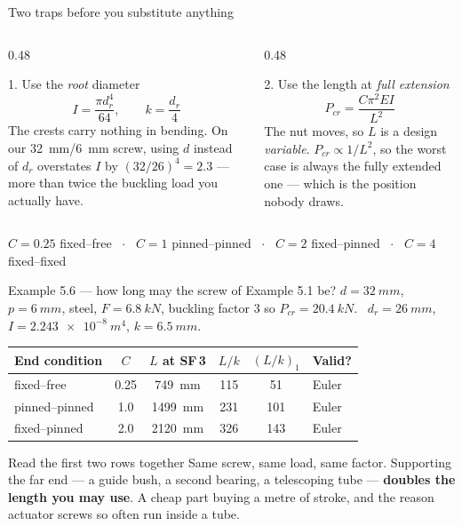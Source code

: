\documentclass[aspectratio=169,10pt]{beamer}
\begin{document}
\begin{frame}{Two traps before you substitute anything}
\begin{columns}[T]
\begin{column}{0.48\textwidth}
\begin{alertblock}{1. Use the \emph{root} diameter}
\[ I=\frac{\pi d_r^{4}}{64},\qquad k=\frac{d_r}{4} \]
The crests carry nothing in bending.
\vspace{2pt}
{\footnotesize On our \SI{32}{mm}/\SI{6}{mm} screw, using $d$ instead of $d_r$ overstates $I$ by
$(32/26)^4 = \mathbf{2.3}$ --- more than twice the buckling load you actually have.}
\end{alertblock}
\end{column}
\begin{column}{0.48\textwidth}
\begin{alertblock}{2. Use the length at \emph{full extension}}
\[ P_{cr}=\frac{C\pi^{2}EI}{L^{2}} \]
The nut moves, so $L$ is a design \emph{variable}.
\vspace{2pt}
{\footnotesize $P_{cr}\propto 1/L^2$, so the worst case is always the fully extended one --- which
is the position nobody draws.}
\end{alertblock}
\end{column}
\end{columns}
\vfill
\centering\footnotesize
$C=0.25$ fixed--free \ $\cdot$ \ $C=1$ pinned--pinned \ $\cdot$ \ $C=2$ fixed--pinned \ $\cdot$ \
$C=4$ fixed--fixed
\end{frame}

\begin{frame}{Example 5.6 --- how long may the screw of Example 5.1 be?}
$d=\SI{32}{mm}$, $p=\SI{6}{mm}$, steel, $F=\SI{6.8}{kN}$, buckling factor 3 so
$P_{cr}=\SI{20.4}{kN}$. \ $d_r=\SI{26}{mm}$, $I=\SI{2.243e-8}{m^4}$, $k=\SI{6.5}{mm}$.
\vfill
\centering\small
\begin{tabular}{@{}lccccl@{}}
\toprule
End condition & $C$ & $L$ at SF\,3 & $L/k$ & $(L/k)_1$ & Valid?\\
\midrule
fixed--free & 0.25 & \SI{749}{mm} & 115 & 51 & Euler\\
pinned--pinned & 1.0 & \SI{1499}{mm} & 231 & 101 & Euler\\
fixed--pinned & 2.0 & \SI{2120}{mm} & 326 & 143 & Euler\\
\bottomrule
\end{tabular}
\vfill
\raggedright
\begin{block}{Read the first two rows together}
Same screw, same load, same factor. Supporting the far end --- a guide bush, a second bearing, a
telescoping tube --- \textbf{doubles the length you may use}. A cheap part buying a metre of stroke,
and the reason actuator screws so often run inside a tube.
\end{block}
\end{frame}
\end{document}
